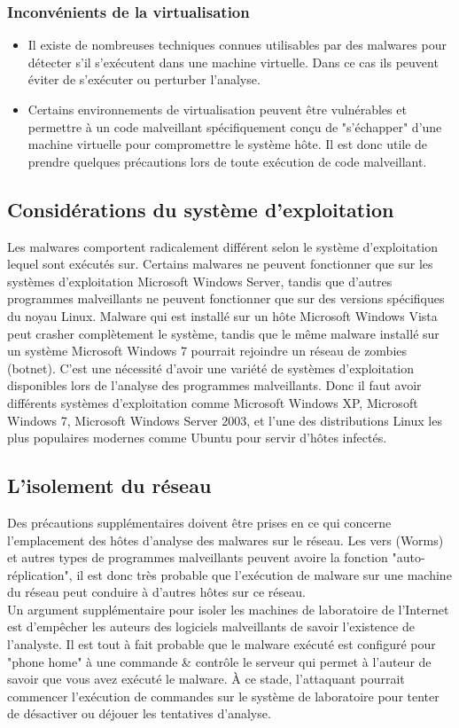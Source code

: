 \subsubsection{Inconvénients de la virtualisation}
\begin{itemize}
\item Il existe de nombreuses techniques connues utilisables par des malwares pour détecter s'il s'exécutent dans une machine virtuelle. Dans ce cas ils peuvent éviter de s'exécuter ou perturber l'analyse.
\item Certains environnements de virtualisation peuvent être vulnérables et permettre à un code malveillant spécifiquement conçu de "s'échapper" d'une machine virtuelle pour compromettre le système hôte. Il est donc utile de prendre quelques précautions
lors de toute exécution de code malveillant.
\end{itemize}


\subsection{Considérations du système d'exploitation}
Les malwares comportent radicalement différent selon le système d'exploitation lequel sont exécutés sur. Certains malwares ne peuvent fonctionner que sur les systèmes d'exploitation Microsoft Windows Server, tandis que d'autres programmes malveillants ne peuvent fonctionner que sur des versions spécifiques du noyau Linux. Malware qui est installé sur un hôte Microsoft Windows Vista peut crasher complètement le système, tandis que le même malware installé sur un système Microsoft Windows 7 pourrait rejoindre un réseau de zombies (botnet). C'est une nécessité d'avoir une variété de systèmes d'exploitation disponibles lors de l'analyse des programmes malveillants. Donc il faut avoir différents systèmes d'exploitation comme Microsoft Windows XP, Microsoft Windows 7, Microsoft Windows Server 2003, et l'une des distributions Linux les plus populaires modernes comme Ubuntu pour servir d'hôtes infectés.
\subsection{L'isolement du réseau}
Des précautions supplémentaires doivent être prises en ce qui concerne l'emplacement des hôtes d'analyse des malwares sur le réseau. Les vers (Worms) et autres types de programmes malveillants peuvent avoire la fonction "auto-réplication", il est donc très probable que l'exécution de malware sur une machine du réseau peut conduire à d'autres hôtes sur ce réseau.\\
Un argument supplémentaire pour isoler les machines de laboratoire de l'Internet est d'empêcher les auteurs des logiciels malveillants de savoir l'existence de l'analyste. Il est tout à fait probable que le malware exécuté est configuré pour "phone home" à une commande \& contrôle le serveur qui permet à l'auteur de savoir  que vous avez exécuté le malware. À ce stade, l'attaquant pourrait commencer l'exécution de commandes sur le système de laboratoire pour tenter de désactiver ou déjouer les tentatives d'analyse.\\

